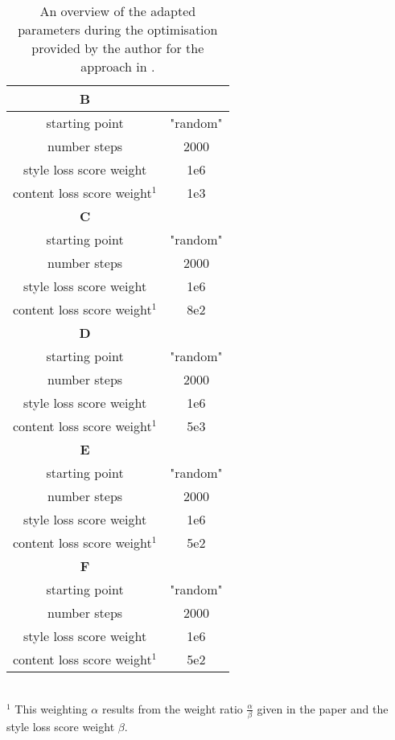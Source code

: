 \begin{table*}[!t]
	\renewcommand{\arraystretch}{1.3}
	\caption{An overview of the adapted parameters during the optimisation provided by the author for the approach in \cite{GEB2016}.}
	\label{tab:Gatys_2016_adapted_params}
	\centering
	\begin{tabular}{c|c}
		\hline
		\bfseries B &  \\
		\hline
		starting point & "random" \\
		number steps & 2000  \\
		style loss score weight & 1e6 \\
		content loss score weight$^1$ &  1e3\\
		\hline
		\bfseries C &  \\
		\hline
		starting point & "random" \\
		number steps & 2000  \\
		style loss score weight & 1e6 \\
		content loss score weight$^1$ &  8e2\\
		\hline
		\bfseries D &  \\
		\hline
		starting point & "random" \\
		number steps & 2000  \\
		style loss score weight & 1e6 \\
		content loss score weight$^1$ &  5e3\\
		\hline
		\bfseries E &  \\
		\hline
		starting point & "random" \\
		number steps & 2000  \\
		style loss score weight & 1e6 \\
		content loss score weight$^1$ &  5e2\\
		\hline
		\bfseries F &  \\
		\hline
		starting point & "random" \\
		number steps & 2000  \\
		style loss score weight & 1e6 \\
		content loss score weight$^1$ &  5e2\\
		\hline
	\end{tabular}
\footnotesize{
	\\$^1$ This weighting $\alpha$ results from the weight ratio $\frac{\alpha}{\beta}$ given in the paper and the style loss score weight $\beta$.
}
\end{table*}

